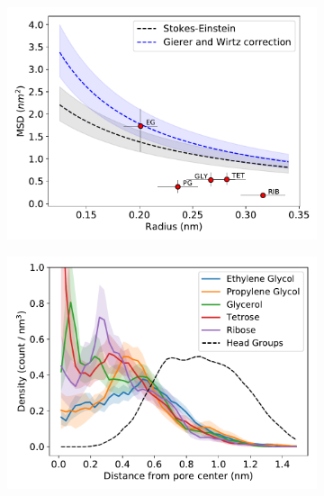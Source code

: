 \documentclass[journal=jpcbfk,manuscript=article]{achemso}
\begin{document}
  \begin{figure}[!htb]
  \centering
  \begin{subfigure}{0.325\textwidth}
  \includegraphics[width=\linewidth]{msd_radius_diols_10wt.pdf}
  \caption{}\label{fig:polyols_msd}
  \end{subfigure}
  \begin{subfigure}{0.325\textwidth}
  \includegraphics[width=\linewidth]{polyols_rdf.pdf}
  \caption{}\label{fig:polyols_rdf}
  \end{subfigure}
  \begin{subfigure}{0.325\textwidth}
  \vspace{-0.275cm}

\end{subfigure}
\end{figure}
\end{document}
